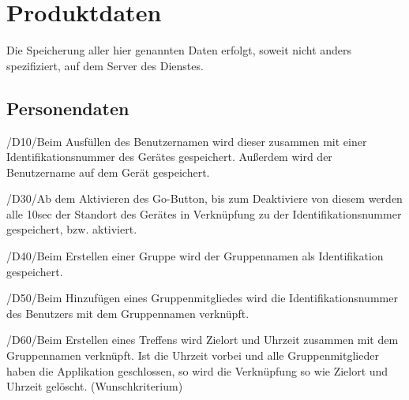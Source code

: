 \section{Produktdaten}

Die Speicherung aller hier genannten Daten erfolgt, soweit nicht anders spezifiziert, auf dem Server des Dienstes.

\subsection{Personendaten}
/D10/Beim Ausfüllen des Benutzernamen wird dieser zusammen mit einer Identifikationsnummer des Gerätes gespeichert. Außerdem wird der Benutzername auf dem Gerät gespeichert.

/D30/Ab dem Aktivieren des Go-Button, bis zum Deaktiviere von diesem werden alle 10sec der Standort des Gerätes in Verknüpfung zu der Identifikationsnummer gespeichert, bzw. aktiviert.

/D40/Beim Erstellen einer Gruppe wird der Gruppennamen als Identifikation gespeichert.

/D50/Beim Hinzufügen eines Gruppenmitgliedes wird die Identifikationsnummer des Benutzers mit dem Gruppennamen verknüpft.

/D60/Beim Erstellen eines Treffens wird Zielort und Uhrzeit zusammen mit dem Gruppennamen verknüpft. Ist die Uhrzeit vorbei und alle Gruppenmitglieder haben die Applikation geschlossen, so wird die Verknüpfung so wie Zielort und Uhrzeit gelöscht. (Wunschkriterium)
